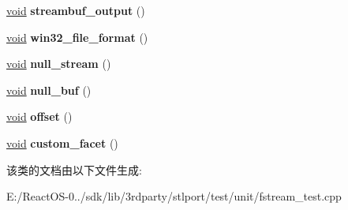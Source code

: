 \begin{DoxyCompactItemize}
\hyperlink{interfacevoid}{void} {\bfseries streambuf\+\_\+output} ()
\item 
\mbox{\label{class_fstream_test_ac56d6b5bca983b5538c3bdd8ef17b9d5}} 
\hyperlink{interfacevoid}{void} {\bfseries win32\+\_\+file\+\_\+format} ()
\item 
\mbox{\label{class_fstream_test_a495f0f01dbe7b0b8645fc3065638565e}} 
\hyperlink{interfacevoid}{void} {\bfseries null\+\_\+stream} ()
\item 
\mbox{\label{class_fstream_test_ad10382157cb27fd2cced6a5ccbedd66b}} 
\hyperlink{interfacevoid}{void} {\bfseries null\+\_\+buf} ()
\item 
\mbox{\label{class_fstream_test_a0eaae86e6e0cde5d0bb5a76652a00f89}} 
\hyperlink{interfacevoid}{void} {\bfseries offset} ()
\item 
\mbox{\label{class_fstream_test_a077c53d3f1db945c963047bc39de46bd}} 
\hyperlink{interfacevoid}{void} {\bfseries custom\+\_\+facet} ()
\end{DoxyCompactItemize}


该类的文档由以下文件生成\+:\begin{DoxyCompactItemize}
\item 
E\+:/\+React\+O\+S-\/0../sdk/lib/3rdparty/stlport/test/unit/fstream\+\_\+test.\+cpp\end{DoxyCompactItemize}
